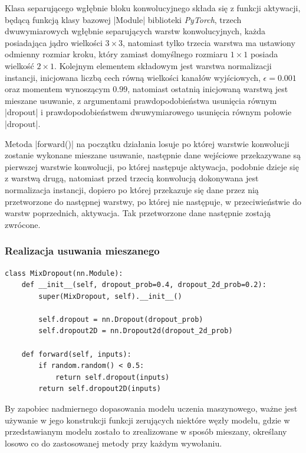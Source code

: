 Klasa separującego wgłębnie bloku konwolucyjnego składa się z funkcji aktywacji, będącą funkcją klasy bazowej \pyth|Module| biblioteki \textit{PyTorch}, trzech dwuwymiarowych wgłębnie separujących warstw konwolucyjnych, każda posiadająca jądro wielkości $3 \times 3$, natomiast tylko trzecia warstwa ma ustawiony odmienny rozmiar kroku, który zamiast domyślnego rozmiaru $1 \times 1$ posiada wielkość $2 \times 1$. Kolejnym elementem składowym jest warstwa normalizacji instancji, inicjowana liczbą cech równą wielkości kanałów wyjściowych, $\epsilon = 0.001$ oraz momentem wynoszącym $0.99$, natomiast ostatnią inicjowaną warstwą jest mieszane usuwanie, z argumentami prawdopodobieństwa usunięcia równym \pyth|dropout| i prawdopodobieństwem dwuwymiarowego usunięcia równym połowie \pyth|dropout|.

Metoda \pyth|forward()| na początku działania losuje po której warstwie konwolucji zostanie wykonane mieszane usuwanie, następnie dane wejściowe przekazywane są pierwszej warstwie konwolucji, po której następuje aktywacja, podobnie dzieje się z warstwą drugą, natomiast przed trzecią konwolucją dokonywana jest normalizacja instancji, dopiero po której przekazuje się dane przez nią przetworzone do następnej warstwy, po której nie następuje, w przeciwieństwie do warstw poprzednich, aktywacja. Tak przetworzone dane następnie zostają zwrócone.



\subsubsection{Realizacja usuwania mieszanego}

\begin{lstlisting}[caption={\pyth|MixDroput| - klasa usuwania mieszanego}, label={mix-dropout}]
class MixDropout(nn.Module):
	def __init__(self, dropout_prob=0.4, dropout_2d_prob=0.2):
		super(MixDropout, self).__init__()
		
		self.dropout = nn.Dropout(dropout_prob)
		self.dropout2D = nn.Dropout2d(dropout_2d_prob)
	
	def forward(self, inputs):
		if random.random() < 0.5:
			return self.dropout(inputs)
		return self.dropout2D(inputs)
\end{lstlisting}

By zapobiec nadmiernego dopasowania modelu uczenia maszynowego, ważne jest używanie w jego konstrukcji funkcji zerujących niektóre węzły modelu, gdzie w przedstawianym modelu zostało to zrealizowane w sposób mieszany, określany losowo co do zastosowanej metody przy każdym wywołaniu.

